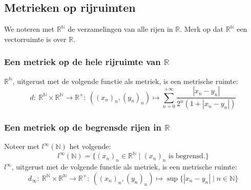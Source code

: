 \documentclass[main.tex]{subfiles}
\begin{document}
\subsection{Metrieken op rijruimten}
\label{sec:metr-op-rijr}

\begin{de}
  We noteren met $\mathbb{R}^{\mathbb{N}}$ de verzamelingen van alle rijen in $\mathbb{R}$.
  Merk op dat $\mathbb{R}^{\mathbb{N}}$ een vectorruimte is over $\mathbb{R}$.
\end{de}

\subsubsection{Een metriek op de hele rijruimte van $\mathbb{R}$}
\label{sec:een-metriek-op}

\begin{vb}
  $\mathbb{R}^{\mathbb{N}}$, uitgerust met de volgende functie als metriek, is een metrische ruimte:
  \[ d:\ \mathbb{R}^{\mathbb{N}} \times \mathbb{R}^{\mathbb{N}} \rightarrow \mathbb{R}^{+}:\ ((x_{n})_{n},(y_{n})_{n}) \mapsto \sum_{n=0}^{+\infty}\frac{|x_{n}-y_{n}|}{2^{n}(1+|x_{n}-y_{n}|)} \]
\end{vb}

\subsubsection{Een metriek op de begrensde rijen in $\mathbb{R}$}
\label{sec:een-metriek-op-1}

\begin{vb}
  Noteer met $l^{\infty}(\mathbb{N})$ het volgende:
  \[ l^{\infty}(\mathbb{N}) = \{ (x_{n})_{n} \in \mathbb{R}^{\mathbb{N}} \mid (x_{n})_{n} \text{ is begrensd.}\} \]
  $l^{\infty}$, uitgerust met de volgende functie als metriek, is een metrische ruimte:
  \[ d_{\infty}:\ \mathbb{R}^{\mathbb{N}} \times \mathbb{R}^{\mathbb{N}} \rightarrow \mathbb{R}^{+}:\ ((x_{n})_{n},(y_{n})_{n}) \mapsto \sup\{|x_{n}-y_{n}| \mid n\in \mathbb{N}\} \]
\end{vb}
\end{document}
